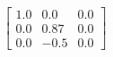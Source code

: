 \documentclass[preview]{standalone}
\begin{document}
\begin{align*}
\left[ \begin{array}{ccc}1.0 & 0.0 & 0.0 \\ 0.0 & 0.87 & 0.0 \\ 0.0 & -0.5 & 0.0\end{array} \right]
\end{align*}
\end{document}
